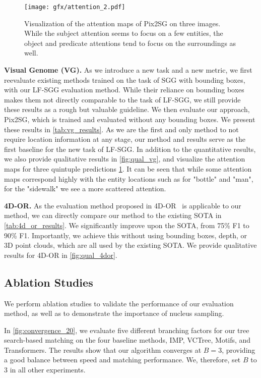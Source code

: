 \documentclass[10pt,twocolumn,letterpaper]{article}
\begin{document}
\begin{figure}[t]
  \centering
  
   \texttt{[image: gfx/attention\_2.pdf]}

   \caption{Visualization of the attention maps of Pix2SG on three images. While the subject attention seems to focus on a few entities, the object and predicate attentions tend to focus on the surroundings as well.}
   \label{fig:attention}
\end{figure}

\noindent\textbf{Visual Genome (VG).} As we introduce a new task and a new metric, we first reevaluate existing methods trained on the task of SGG with bounding boxes, with our LF-SGG evaluation method. While their reliance on bounding boxes makes them not directly comparable to the task of LF-SGG, we still provide these results as a rough but valuable guideline. We then evaluate our approach, Pix2SG, which is trained and evaluated without any bounding boxes. We present these results in \cref{tab:vg_results}. 
As we are the first and only method to not require location information at any stage, our method and results serve as the first baseline for the new task of LF-SGG. In addition to the quantitative results, we also provide qualitative results in \cref{fig:qual_vg}, and visualize the attention maps for three quintuple predictions \cref{fig:attention}. It can be seen that while some attention maps correspond highly with the entity locations such as for "bottle" and "man", for the "sidewalk" we see a more scattered attention. 

\noindent\textbf{4D-OR.} As the evaluation method proposed in 4D-OR~\cite{ozsoy_4d-or_2022} is applicable to our method, we can directly compare our method to the existing SOTA in \cref{tab:4d_or_results}. We significantly improve upon the SOTA, from 75\% F1 to 90\% F1. Importantly, we achieve this without using bounding boxes, depth, or 3D point clouds, which are all used by the existing SOTA. We provide qualitative results for 4D-OR in \cref{fig:qual_4dor}.

\subsection{Ablation Studies}
\label{sec:ablationstudies}
We perform ablation studies to validate the performance of our evaluation method, as well as to demonstrate the importance of nucleus sampling.

In \cref{fig:convergence_20}, we evaluate five different branching factors for our tree search-based matching on the four baseline methods, IMP, VCTree, Motifs, and Transformers. The results show that our algorithm converges at $B=3$, providing a good balance between speed and matching performance. We, therefore, set $B$ to 3 in all other experiments. 
\end{document}
